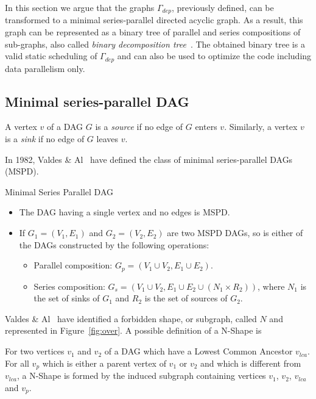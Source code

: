 In this section we argue that the graphs $\Gamma_{dep}$, previously defined, can be transformed to a minimal series-parallel directed acyclic graph. As a result, this graph can be represented as a binary tree of parallel and series compositions of sub-graphs, also called \emph{binary decomposition tree}~\cite{Valdes:1979:RSP:800135.804393}. The obtained binary tree is a valid static scheduling of $\Gamma_{dep}$ and can also be used to optimize the code including data parallelism only.

\subsection{Minimal series-parallel DAG}
\begin{mydef}
A vertex $v$ of a DAG $G$ is a \emph{source} if no edge of $G$ enters $v$. Similarly, a vertex $v$ is a \emph{sink} if no edge of $G$ leaves $v$. 
\end{mydef}

In 1982, Valdes \& Al~\cite{Valdes:1979:RSP:800135.804393} have defined the class of minimal series-parallel DAGs (MSPD).

\begin{mydef}Minimal Series Parallel DAG
\begin{itemize}
\item The DAG having a single vertex and no edges is MSPD.
\item If $G_1=(V_1,E_1)$ and $G_2=(V_2,E_2)$ are two MSPD DAGs, so is either of the DAGs constructed by the following operations:
\begin{itemize}
\item Parallel composition: $G_p=(V_1\cup V_2,E_1\cup E_2)$.
\item Series composition: $G_s=(V_1\cup V_2,E_1\cup E_2\cup (N_1 \times R_2))$, where $N_1$ is the set of sinks of $G_1$ and $R_2$ is the set of sources of $G_2$.
\end{itemize}
\end{itemize}
\end{mydef}

Valdes \& Al~\cite{Valdes:1979:RSP:800135.804393} have identified a forbidden shape, or subgraph, called $N$ and represented in Figure~\ref{fig:over}. A possible definition of a N-Shape is
\begin{mydef}
For two vertices $v_1$ and $v_2$ of a DAG which have a Lowest Common Ancestor $v_{lca}$. For all $v_p$ which is either a parent vertex of $v_1$ or $v_2$ and which is different from $v_{lca}$, a N-Shape is formed by the induced subgraph containing vertices $v_1$, $v_2$, $v_{lca}$ and $v_p$.
\end{mydef}

